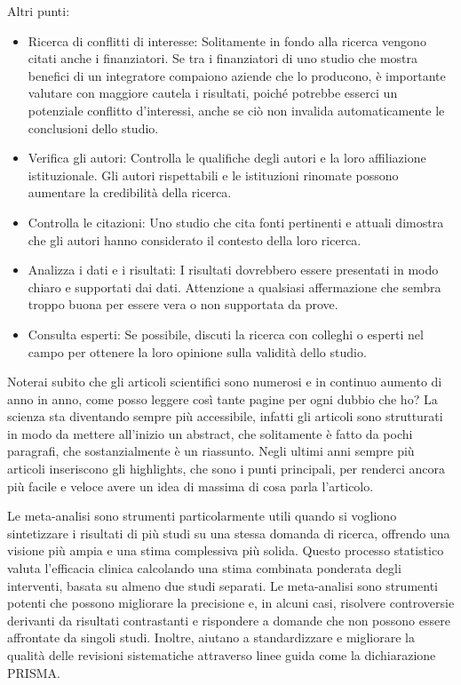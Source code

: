 \documentclass[12pt]{book} %
\begin{document}
Altri punti:
\begin{itemize}
\item Ricerca di conflitti di interesse: Solitamente in fondo alla ricerca vengono citati anche i finanziatori. Se tra i finanziatori di uno studio che mostra benefici di un integratore compaiono aziende che lo producono, è importante valutare con maggiore cautela i risultati, poiché potrebbe esserci un potenziale conflitto d’interessi, anche se ciò non invalida automaticamente le conclusioni dello studio.
\item Verifica gli autori: Controlla le qualifiche degli autori e la loro affiliazione istituzionale. Gli autori
rispettabili e le istituzioni rinomate possono aumentare la credibilità della ricerca.
\item Controlla le citazioni: Uno studio che cita fonti pertinenti e attuali dimostra che gli autori hanno considerato
il contesto della loro ricerca.
\item Analizza i dati e i risultati: I risultati dovrebbero essere presentati in modo chiaro e supportati dai dati.
Attenzione a qualsiasi affermazione che sembra troppo buona per essere vera o non supportata da prove.
\item Consulta esperti: Se possibile, discuti la ricerca con colleghi o esperti nel campo per ottenere la loro opinione
sulla validità dello studio.
\end{itemize}

Noterai subito che gli articoli scientifici sono numerosi e in continuo aumento di anno in anno, come posso leggere così
tante pagine per ogni dubbio che ho? La scienza sta diventando sempre più accessibile, infatti gli articoli sono
strutturati in modo da mettere all'inizio un abstract, che solitamente è fatto da pochi paragrafi,
che sostanzialmente è un riassunto. Negli ultimi anni sempre più articoli inseriscono gli highlights, che sono i punti
principali, per renderci ancora più facile e veloce avere un idea di massima di cosa parla
l'articolo.

Le meta-analisi sono strumenti particolarmente utili quando si vogliono sintetizzare i risultati di più studi su una stessa domanda di ricerca, offrendo una visione più ampia e una stima complessiva più solida. Questo processo statistico valuta
l'efficacia clinica calcolando una stima combinata ponderata degli interventi, basata su almeno
due studi separati. Le meta-analisi sono strumenti potenti che possono migliorare la precisione e, in alcuni casi, risolvere controversie
derivanti da risultati contrastanti e rispondere a domande che non possono essere affrontate da singoli studi. Inoltre,
aiutano a standardizzare e migliorare la qualità delle revisioni sistematiche attraverso linee guida come la
dichiarazione PRISMA.
\end{document}
